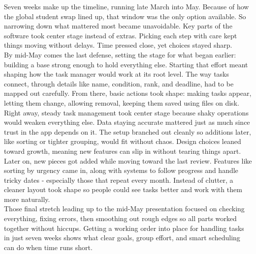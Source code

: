 \documentclass{article}
\begin{document}
Seven weeks make up the timeline, running late March into May. Because of how the global student swap lined up, that window was the only option available. So narrowing down what mattered most became unavoidable. Key parts of the software took center stage instead of extras. Picking each step with care kept things moving without delays. Time pressed close, yet choices stayed sharp.
\\

By mid-May comes the last defense, setting the stage for what began earlier: building a base strong enough to hold everything else. Starting that effort meant shaping how the task manager would work at its root level. The way tasks connect, through details like name, condition, rank, and deadline, had to be mapped out carefully. From there, basic actions took shape: making tasks appear, letting them change, allowing removal, keeping them saved using files on disk.
\\

Right away, steady task management took center stage because shaky operations would weaken everything else. Data staying accurate mattered just as much since trust in the app depends on it. The setup branched out cleanly so additions later, like sorting or tighter grouping, would fit without chaos. Design choices leaned toward growth, meaning new features can slip in without tearing things apart.
\\

Later on, new pieces got added while moving toward the last review. Features like sorting by urgency came in, along with systems to follow progress and handle tricky dates - especially those that repeat every month. Instead of clutter, a cleaner layout took shape so people could see tasks better and work with them more naturally.
\\

Those final stretch leading up to the mid-May presentation focused on checking everything, fixing errors, then smoothing out rough edges so all parts worked together without hiccups. Getting a working order into place for handling tasks in just seven weeks shows what clear goals, group effort, and smart scheduling can do when time runs short.
\end{document}
